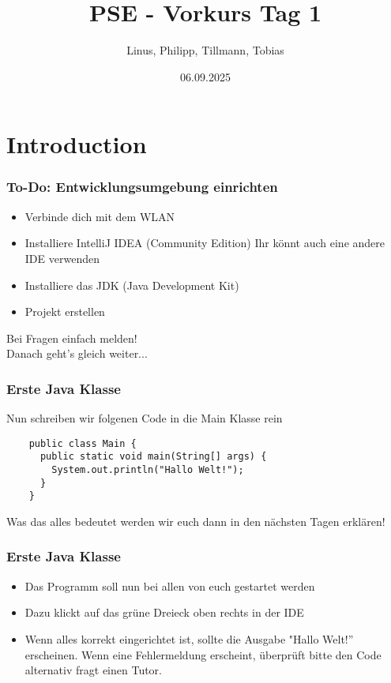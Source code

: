 \documentclass{../../presentation}
\title{PSE - Vorkurs Tag 1}
\author{Linus, Philipp, Tillmann, Tobias}
\institute{FIUS - Fachgruppe Informatik Universität Stuttgart}
\date{06.09.2025}
\begin{document}
\begin{frame}
  \titlepage
\end{frame}

\section{Introduction}

\begin{frame}
  \frametitle{To-Do: Entwicklungsumgebung einrichten}

  \begin{itemize}
    \item Verbinde dich mit dem WLAN
    \item Installiere IntelliJ IDEA (Community Edition) \newline
          \achtung{} Ihr könnt auch eine andere IDE verwenden
    \item Installiere das JDK (Java Development Kit)
    \item Projekt erstellen
  \end{itemize}
  \vfill
  \centering
  \Large
  Bei Fragen einfach melden! \\
  \vspace{0.5em}
  Danach geht's gleich weiter...
\end{frame}




\begin{frame}[fragile]
  \frametitle{Erste Java Klasse}
  Nun schreiben wir folgenen Code in die Main Klasse rein
  \begin{verbatim}
    public class Main {
      public static void main(String[] args) {
        System.out.println("Hallo Welt!");
      }
    }
  \end{verbatim}
  \achtung{} Was das alles bedeutet werden wir euch dann in den nächsten Tagen erklären!
\end{frame}

\begin{frame}
  \frametitle{Erste Java Klasse}
  \begin{itemize}
    \item Das Programm soll nun bei allen von euch gestartet werden
    \item Dazu klickt auf das grüne Dreieck oben rechts in der IDE
    \item Wenn alles korrekt eingerichtet ist, sollte die Ausgabe "Hallo Welt!'' erscheinen.
          \achtung{} Wenn eine Fehlermeldung erscheint, überprüft bitte den Code alternativ fragt einen Tutor.
  \end{itemize}
\end{frame}
\end{document}
